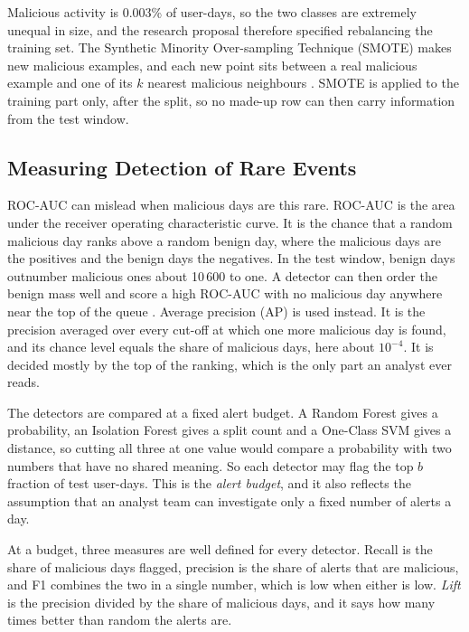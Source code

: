 \documentclass[a4paper,12pt]{article}
\begin{document}
Malicious activity is 0.003\% of user-days, so the two classes are extremely unequal in size, and the research proposal therefore specified rebalancing the training set. The Synthetic Minority Over-sampling Technique (SMOTE) makes new malicious examples, and each new point sits between a real malicious example and one of its $k$ nearest malicious neighbours \cite{Chawla2002}. SMOTE is applied to the training part only, after the split, so no made-up row can then carry information from the test window.

\subsection{Measuring Detection of Rare Events}
ROC-AUC can mislead when malicious days are this rare. ROC-AUC is the area under the receiver operating characteristic curve. It is the chance that a random malicious day ranks above a random benign day, where the malicious days are the positives and the benign days the negatives. In the test window, benign days outnumber malicious ones about 10\,600 to one. A detector can then order the benign mass well and score a high ROC-AUC with no malicious day anywhere near the top of the queue \cite{Davis2006,Saito2015}. Average precision (AP) is used instead. It is the precision averaged over every cut-off at which one more malicious day is found, and its chance level equals the share of malicious days, here about $10^{-4}$. It is decided mostly by the top of the ranking, which is the only part an analyst ever reads.

The detectors are compared at a fixed alert budget. A Random Forest gives a probability, an Isolation Forest gives a split count and a One-Class SVM gives a distance, so cutting all three at one value would compare a probability with two numbers that have no shared meaning. So each detector may flag the top $b$ fraction of test user-days. This is the \emph{alert budget}, and it also reflects the assumption that an analyst team can investigate only a fixed number of alerts a day.

At a budget, three measures are well defined for every detector. Recall is the share of malicious days flagged, precision is the share of alerts that are malicious, and F1 combines the two in a single number, which is low when either is low. \emph{Lift} is the precision divided by the share of malicious days, and it says how many times better than random the alerts are.
\end{document}
